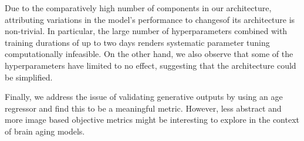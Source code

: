 Due to the comparatively high number of components in our architecture, attributing variations in the model's performance to changesof its architecture is non-trivial.
In particular, the large number of hyperparameters combined with training durations of up to two days renders systematic parameter tuning computationally infeasible. On the other hand, we also observe that some of the hyperparameters have limited to no effect, suggesting that the architecture could be simplified.

Finally, we address the issue of validating generative outputs by using an age regressor and find this to be a meaningful metric. However, less abstract and more image based objective metrics might be interesting to explore in the context of brain aging models.

